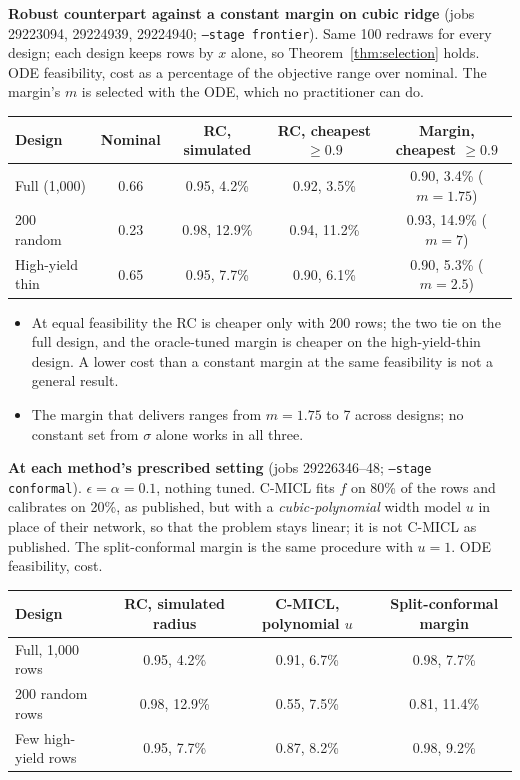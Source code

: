 \begin{outline}
\textbf{Robust counterpart against a constant margin on cubic ridge}
(jobs 29223094, 29224939, 29224940; \texttt{--stage frontier}). Same 100
redraws for every design; each design keeps rows by $x$ alone, so
Theorem~\ref{thm:selection} holds. ODE feasibility, cost as a percentage of
the objective range over nominal. The margin's $m$ is selected with the ODE,
which no practitioner can do.

\smallskip
\begin{tabular}{@{}lcccc@{}}
\toprule
Design & Nominal & RC, simulated & RC, cheapest $\ge 0.9$ & Margin, cheapest $\ge 0.9$ \\
\midrule
Full (1,000)     & 0.66 & 0.95, 4.2\%  & 0.92, 3.5\%  & 0.90, 3.4\% ($m{=}1.75$) \\
200 random       & 0.23 & 0.98, 12.9\% & 0.94, 11.2\% & 0.93, 14.9\% ($m{=}7$) \\
High-yield thin  & 0.65 & 0.95, 7.7\%  & 0.90, 6.1\%  & 0.90, 5.3\% ($m{=}2.5$) \\
\bottomrule
\end{tabular}
\smallskip

\begin{itemize}
  \item At equal feasibility the RC is cheaper only with 200 rows; the two tie
    on the full design, and the oracle-tuned margin is cheaper on the
    high-yield-thin design. A lower cost than a constant margin at the same
    feasibility is not a general result.
  \item The margin that delivers ranges from $m = 1.75$ to 7 across designs;
    no constant set from $\sigma$ alone works in all three.
\end{itemize}

\textbf{At each method's prescribed setting} (jobs 29226346--48;
\texttt{--stage conformal}). $\epsilon = \alpha = 0.1$, nothing tuned. C-MICL
fits $f$ on 80\% of the rows and calibrates on 20\%, as published, but with a
\emph{cubic-polynomial} width model $u$ in place of their network, so that
the problem stays linear; it is not C-MICL as published. The split-conformal
margin is the same procedure with $u = 1$. ODE feasibility, cost.

\smallskip
\begin{tabular}{@{}lccc@{}}
\toprule
Design & RC, simulated radius & C-MICL, polynomial $u$ & Split-conformal margin \\
\midrule
Full, 1,000 rows     & 0.95, 4.2\%  & 0.91, 6.7\% & 0.98, 7.7\%  \\
200 random rows      & 0.98, 12.9\% & 0.55, 7.5\% & 0.81, 11.4\% \\
Few high-yield rows  & 0.95, 7.7\%  & 0.87, 8.2\% & 0.98, 9.2\%  \\
\bottomrule
\end{tabular}
\smallskip


\end{outline}
